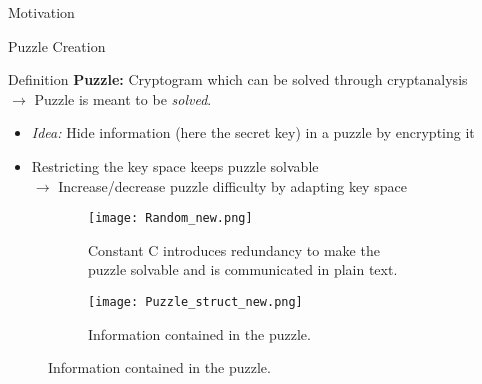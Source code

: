 \documentclass[final]{beamer}
\begin{document}
\begin{frame}[fragile]
\begin{columns}[t]
\begin{leftcolumn}
\begin{boxblock}{Motivation}
   \end{boxblock}


   \begin{boxblock}{Puzzle Creation}
   	\justifying
   	\begin{block}{Definition}
   			\justifying
   	\textbf{Puzzle:} Cryptogram which can be solved through cryptanalysis \\ $\rightarrow$ Puzzle is meant to be \emph{solved}.
   	\end{block}
 
   	\begin{itemize}
   		\item \emph{Idea:} Hide information (here the secret key) in a puzzle by encrypting it
   		\item Restricting the key space keeps puzzle solvable \\ $\rightarrow$ Increase/decrease puzzle difficulty by adapting key space
   	\end{itemize}
   	
   	\begin{figure}
   		\begin{subfigure}{0.95\textwidth}
   			\texttt{[image: Random\_new.png]}
   			\vspace{0.1cm}
   			\caption{Constant C introduces redundancy to make the puzzle solvable and is communicated in plain text.}
   		\end{subfigure}
   	    \begin{subfigure}{0.53\textwidth}
   		\texttt{[image: Puzzle\_struct\_new.png]}
   		\vspace{0.1cm}
   		\caption{Information contained in the puzzle.}
   	\end{subfigure}
   	\end{figure}
 

  

      
   \end{boxblock}

\end{leftcolumn} %


\iflandscape
   \begin{centercolumn}


\end{centercolumn}
\end{columns}
\end{frame}
\end{document}
